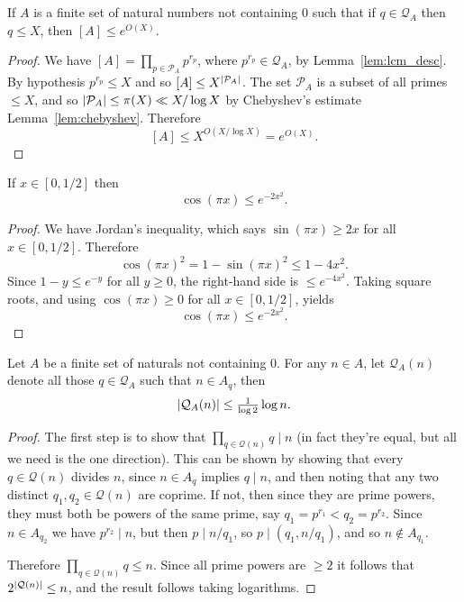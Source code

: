 \begin{lemma}\label{lem:smooth_lcm}
  \leanok
If $A$ is a finite set of natural numbers not containing $0$ such that if $q\in\mathcal{Q}_A$ then $q\leq X$, then $[A]\leq e^{O(X)}$.
\end{lemma}
\begin{proof}
  \leanok
  We have $[A]=\prod_{p\in\mathcal{P}_A}p^{r_p}$, where $p^{r_p}\in \mathcal{Q}_A$, by Lemma~\ref{lem:lcm_desc}. By hypothesis $p^{r_p}\leq X$ and so $[A]\leq X^{\left\lvert \mathcal{P}_A\right\rvert}$. The set $\mathcal{P}_A$ is a subset of all primes $\leq X$, and so $\left\lvert \mathcal{P}_A\right\rvert\leq \pi(X)\ll X/\log X$ by Chebyshev's estimate Lemma~\ref{lem:chebyshev}. Therefore
  \[[A]\leq X^{O(X/\log X)}=e^{O(X)}.\]
\end{proof}

\begin{lemma}\label{lem:cos_bound}
  \leanok
If $x\in [0,1/2]$ then
\[\cos(\pi x) \leq e^{-2x^2}.\]
\end{lemma}
\begin{proof}
  \leanok
We have Jordan's inequality, which says $\sin(\pi x)\geq 2x$ for all $x\in[0,1/2]$. Therefore
\[\cos(\pi x)^2 = 1-\sin(\pi x)^2\leq 1-4x^2.\]
Since $1-y\leq e^{-y}$ for all $y\geq 0$, the right-hand side is $\leq e^{-4x^2}$. Taking square roots, and using $\cos(\pi x)\geq 0$ for all $x\in[0,1/2]$, yields
\[\cos(\pi x) \leq e^{-2x^2}.\]
\end{proof}

\begin{lemma}\label{lem:triv_q_bound}
  \leanok
Let $A$ be a finite set of naturals not containing $0$. For any $n\in A$, let $\mathcal{Q}_A(n)$ denote all those $q\in \mathcal{Q}_A$ such that $n\in A_q$, then
\[\left\lvert \mathcal{Q}_A(n)\right\rvert\leq  \tfrac{1}{\log 2}\log n.\]
\end{lemma}
\begin{proof}
  \leanok
The first step is to show that $\prod_{q\in\mathcal{Q}(n)}q\mid n$ (in fact they're equal, but all we need is the one direction). This can be shown by showing that every $q\in\mathcal{Q}(n)$ divides $n$, since $n\in A_q$ implies $q\mid n$,  and then noting that any two distinct $q_1,q_2\in \mathcal{Q}(n)$ are coprime. If not, then since they are prime powers, they must both be powers of the same prime, say $q_1=p^{r_1}< q_2=p^{r_2}$. Since $n\in A_{q_2}$ we have $p^{r_2}\mid n$, but then $p\mid n/q_1$, so $p\mid (q_1,n/q_1)$, and so $n\not\in A_{q_1}$.

Therefore $\prod_{q\in\mathcal{Q}(n)}q\leq n$. Since all prime powers are $\geq 2$ it follows that $2^{\left\lvert \mathcal{Q}(n)\right\rvert}\leq n$, and the result follows taking logarithms.
\end{proof}

